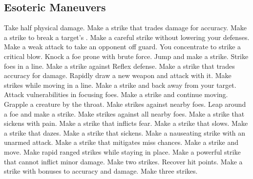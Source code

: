 
\small
\subsection{Esoteric Maneuvers}\label{Esoteric Maneuvers}
\begin{spelllist}
 Take half physical damage.
 Make a strike that trades damage for accuracy.
 Make a strike to break a target's .
 Make a careful strike without lowering your defenses.
 Make a weak attack to take an opponent off guard.
 You concentrate to strike a critical blow.
 Knock a foe prone with brute force.
 Jump and make a strike.
 Strike foes in a line.
 Make a strike against Reflex defense.
 Make a strike that trades accuracy for damage.
 Rapidly draw a new weapon and attack with it.
 Make strikes while moving in a line.
 Make a strike and back away from your target.
 Attack vulnerabilities in focusing foes.
 Make a strike and continue moving.
 Grapple a creature by the throat.
 Make strikes against nearby foes.
 Leap around a foe and make a strike.
 Make strikes against all nearby foes.
 Make a strike that sickens with pain.
 Make a strike that inflicts fear.
 Make a strike that slows.
 Make a strike that dazes.
 Make a strike that sickens.
 Make a nauseating strike with an unarmed attack.
 Make a strike that mitigates miss chances.
 Make a strike and move.
 Make rapid ranged strikes while staying in place.
 Make a powerful strike that cannot inflict minor damage.
 Make two strikes.
 Recover hit points.
 Make a strike with bonuses to accuracy and damage.
 Make three strikes.
\end{spelllist}



